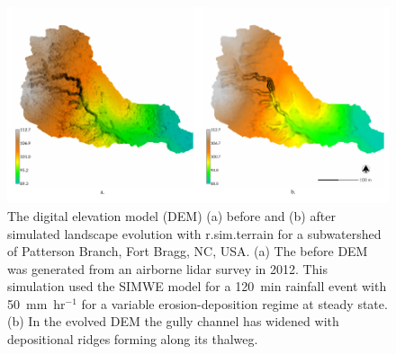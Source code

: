\documentclass[gmd, manuscript]{copernicus}
\begin{document}


\begin{figure}%
\center
\includegraphics[width=\textwidth,height=0.925\textheight,keepaspectratio]{figures/evolution.pdf}
\caption{
The digital elevation model (DEM) 
(a) before and (b) after
simulated landscape evolution with r.sim.terrain 
for a subwatershed of Patterson Branch, Fort Bragg, NC, USA. 
(a) The before DEM was generated from an airborne lidar survey in 2012. 
This simulation used the SIMWE model
for a 120~\unit{min} rainfall event with 50~\unit{mm~hr}$^{-1}$
for a variable erosion-deposition regime at steady state.
(b) In the evolved DEM 
the gully channel has widened 
with depositional ridges forming along its thalweg.}
\label{fig:evolution}
\end{figure}

\end{document}
